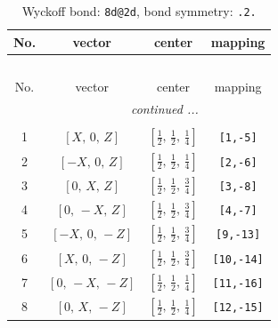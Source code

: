 \documentclass[fleqn,8pt]{jsarticle}
\begin{document}
\begin{longtable}{cccc}
\caption{Wyckoff bond: {\tt 8d@2d}, bond symmetry: {\tt .2.}}
 \\
 \hline \hline
No. & vector & center & mapping \\ \hline \endfirsthead

\multicolumn{3}{l}{\tablename\ \thetable{}} \\
 \hline \hline
No. & vector & center & mapping \\ \hline \endhead

 \hline \hline
\multicolumn{3}{r}{\footnotesize\it continued ...} \\ \endfoot

 \hline \hline
\multicolumn{3}{r}{} \\ \endlastfoot

1 & $\left[ X,\, 0,\, Z \right]$ & $\left[ \frac{1}{2},\, \frac{1}{2},\, \frac{1}{4} \right]$ & {\tt [1,-5]} \\ \hline
2 & $\left[ - X,\, 0,\, Z \right]$ & $\left[ \frac{1}{2},\, \frac{1}{2},\, \frac{1}{4} \right]$ & {\tt [2,-6]} \\ \hline
3 & $\left[ 0,\, X,\, Z \right]$ & $\left[ \frac{1}{2},\, \frac{1}{2},\, \frac{3}{4} \right]$ & {\tt [3,-8]} \\ \hline
4 & $\left[ 0,\, - X,\, Z \right]$ & $\left[ \frac{1}{2},\, \frac{1}{2},\, \frac{3}{4} \right]$ & {\tt [4,-7]} \\ \hline
5 & $\left[ - X,\, 0,\, - Z \right]$ & $\left[ \frac{1}{2},\, \frac{1}{2},\, \frac{3}{4} \right]$ & {\tt [9,-13]} \\ \hline
6 & $\left[ X,\, 0,\, - Z \right]$ & $\left[ \frac{1}{2},\, \frac{1}{2},\, \frac{3}{4} \right]$ & {\tt [10,-14]} \\ \hline
7 & $\left[ 0,\, - X,\, - Z \right]$ & $\left[ \frac{1}{2},\, \frac{1}{2},\, \frac{1}{4} \right]$ & {\tt [11,-16]} \\ \hline
8 & $\left[ 0,\, X,\, - Z \right]$ & $\left[ \frac{1}{2},\, \frac{1}{2},\, \frac{1}{4} \right]$ & {\tt [12,-15]} \\
\end{longtable}
\renewcommand{\arraystretch}{1.2}
\end{document}
